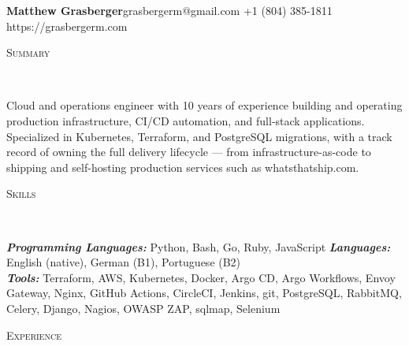 \documentclass[a4paper,9pt]{extarticle}
\newenvironment{changemargin}[2]{%
  \begin{list}{}{%
    \setlength{\topsep}{0pt}%
    \setlength{\leftmargin}{#1}%
    \setlength{\rightmargin}{#2}%
    \setlength{\listparindent}{\parindent}%
    \setlength{\itemindent}{\parindent}%
    \setlength{\parsep}{\parskip}%
  }%
  \item[]}{\end{list}
}
\newcommand{\lineover}{
	\begin{changemargin}{-0.05in}{-0.05in}
		\vspace*{-8pt}
		\hrulefill \\
		\vspace*{0pt}
	\end{changemargin}
}
\newcommand{\header}[1]{
	\begin{changemargin}{-0.5in}{-0.5in}
		\scshape{#1}\\
  	\lineover
	\end{changemargin}
}
\newcommand{\contact}[4]{
	\begin{changemargin}{-0.5in}{-0.5in}
		{\huge \bfseries #1}\hfill {\small #2 \;\textbar\; #3 \;\textbar\; #4}
	\end{changemargin}
	\smallskip
}
\newenvironment{body} {
	\vspace*{-10pt}
	\begin{changemargin}{-0.25in}{-0.5in}
  }	
	{\end{changemargin}
}
\begin{document}
\contact{Matthew Grasberger}{grasbergerm@gmail.com}{+1 (804) 385-1811}{https://grasbergerm.com}


\header{Summary}

\begin{body}
	\vspace{12pt}
	Cloud and operations engineer with 10 years of experience building and operating production infrastructure, CI/CD automation, and full-stack applications. Specialized in Kubernetes, Terraform, and PostgreSQL migrations, with a track record of owning the full delivery lifecycle --- from infrastructure-as-code to shipping and self-hosting production services such as whatsthatship.com.
\end{body}
\vspace{9pt}
\header{Skills}

\begin{body}
	\vspace{12pt}
	\emph{\textbf{Programming Languages:}} Python, Bash, Go, Ruby, JavaScript \hfill \emph{\textbf{Languages:}} English (native), German (B1), Portuguese (B2)\\
	\smallskip
	\emph{\textbf{Tools:}} Terraform, AWS, Kubernetes, Docker, Argo CD, Argo Workflows, Envoy Gateway, Nginx, GitHub Actions, CircleCI, Jenkins, git, PostgreSQL, RabbitMQ, Celery, Django, Nagios, OWASP ZAP, sqlmap, Selenium\\
\end{body}
\vspace{9pt}
\header{Experience}
\end{document}
